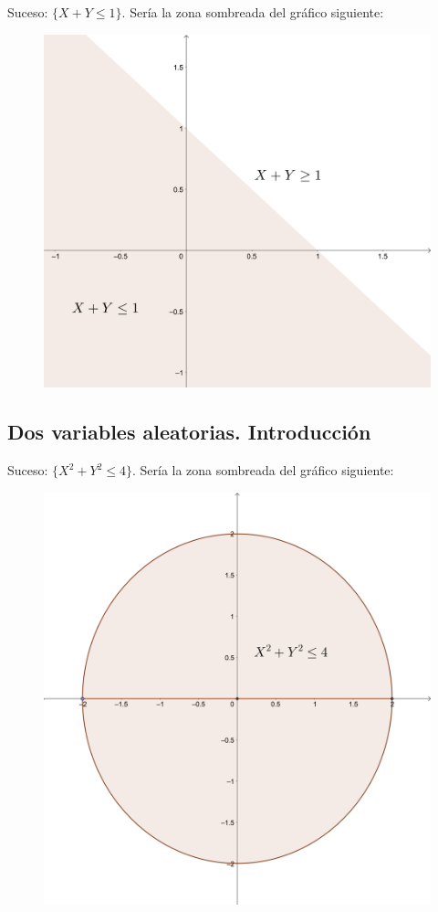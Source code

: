 \documentclass[]{book}
\begin{document}
Suceso: \(\{X+Y\leq 1\}\). Sería la zona sombreada del gráfico siguiente:

\begin{figure}
\includegraphics[width=450px]{Images/Bidim1} \end{figure}

\hypertarget{dos-variables-aleatorias.-introducciuxf3n-1}{%
\subsection{Dos variables aleatorias. Introducción}\label{dos-variables-aleatorias.-introducciuxf3n-1}}

Suceso: \(\{X^2+Y^2\leq 4\}\). Sería la zona sombreada del gráfico siguiente:

\begin{figure}
\includegraphics[width=450px]{Images/Bidim2} \end{figure}
\end{document}
